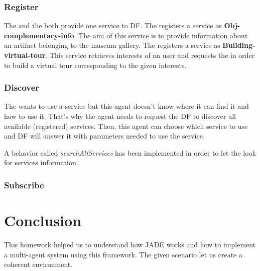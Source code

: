 \documentclass[a4paper,11pt]{article}
\begin{document}
  
  \subsubsection{Register} %
  
  
  The \cu{} and the \to{} both provide one service to DF. The \cu{} registers a service as \textbf{Obj-complementary-info}.
  The aim of this service is to provide information about an artifact belonging to the museum gallery.
  The \to{} registers a service as \textbf{Building-virtual-tour}. This service retrieves interests of an user and requests 
  the \cu{} in order to build a virtual tour corresponding to the given interests.
  
  \subsubsection{Discover} %
  The \pa{} wants to use a service but this agent doesn't know where it can find it and how to use it. That's why the agent needs 
  to request the DF to discover all available (registered) services. Then, this agent can choose which service to use and DF will 
  answer it with parameters needed to use the service.
  
  A behavior called \textit{searchAllServices} has been implemented in order to let the \pa{} look for services information.
  
  
  \subsubsection{Subscribe} %
  
  \section{Conclusion}
  
  This homework helped us to understand how JADE works and how to implement a multi-agent system using this framework. The given 
  scenario let us create a coherent environment.
  
\end{document}
